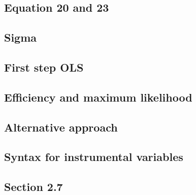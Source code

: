 \documentclass[12pt,english]{scrartcl}
\begin{document}
\subsection{Equation 20 and 23}

\subsection{Sigma}

\subsection{First step OLS}

\subsection{Efficiency and maximum likelihood}
% 

\subsection{Alternative approach}

\subsection{Syntax for instrumental variables}

\subsection{Section 2.7}
\end{document}
